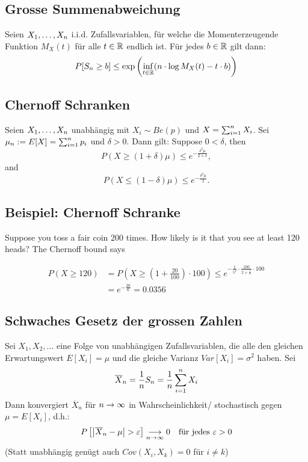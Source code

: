 \subsection*{Grosse Summenabweichung}
Seien $X_1, \dots, X_n$ i.i.d. Zufallsvariablen, für welche die
Momenterzeugende Funktion $M_X (t)$ für alle $t \in \mathbb{R}$ endlich ist. Für jedes
$b \in \mathbb{R}$ gilt dann:
\begin{align*}
  P[S_n \geq b] \leq \exp \left( \inf_{t \in \mathbb{R}}  ( n \cdot \log M_X (t) - t \cdot b ) \right)
\end{align*}

\subsection*{Chernoff Schranken}
Seien $X_1, \dots, X_n$ unabhängig mit $X_i \sim Be (p)$ und $X = \sum_{i = 1}^n X_i$.
Sei $\mu_n := E[X] = \sum_{i = 1}^n p_i$ und $\delta > 0$. Dann gilt:
Suppose $0 < \delta$, then
\[ P(X \geq (1 + \delta)\mu) \leq e^{-\frac{\delta^2\mu}{2+\delta}}, \]
and
\[ P(X \leq (1 - \delta)\mu) \leq e^{-\frac{\delta^2\mu}{2}}. \]

\BoxStart{}
\subsection*{Beispiel: Chernoff Schranke}
Suppose you toss a fair coin 200 times. How likely is it that you see
at least 120 heads?
The Chernoff bound says

\begin{align*}
  P(X \geq 120) &= P(X \geq (1 + \frac{20}{100}) \cdot 100) \leq e^{-\frac{1}{5^2} \cdot \frac{100}{2+\frac{1}{5}} \cdot 100} \\
                &= e^{-\frac{20}{6}} = 0.0356
\end{align*}

\BoxEnd{}
\subsection*{Schwaches Gesetz der grossen Zahlen}
Sei $X_1, X_2, \dots$ eine Folge von unabhängigen Zufallsvariablen, die alle
den gleichen Erwartungswert $E[X_i] = \mu$ und die gleiche Varianz $Var[X_i] =
  \sigma^2$ haben. Sei
\begin{align*}
  \overline{X}_n = \frac{1}{n} S_n = \frac{1}{n} \sum_{i = 1}^n X_i
\end{align*}
Dann konvergiert $\overline{X}_n$ für $n \rightarrow \infty$ in Wahrscheinlichkeit/
stochastisch gegen $\mu = E[X_i]$, d.h.:
\begin{align*}
  P \left[ \abs{\overline{X}_n - \mu} > \varepsilon \right] \underset{n \rightarrow \infty}{\longrightarrow} 0
   &  & \text{für jedes } \varepsilon > 0
\end{align*}
(Statt unabhängig genügt auch $Cov (X_i, X_k) = 0$ für $i \neq k$)
